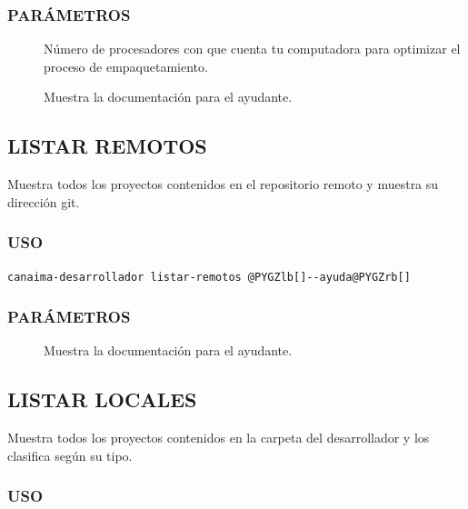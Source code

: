 \documentclass[letterpaper,12pt,spanish]{manual}
\begin{document}
\subsubsection{PARÁMETROS}
\begin{description}
\item[{}] \leavevmode
Número de procesadores con que cuenta tu computadora para optimizar el proceso de empaquetamiento.

\item[{}] \leavevmode
Muestra la documentación para el ayudante.

\end{description}


\subsection{\textbf{LISTAR REMOTOS}}

Muestra todos los proyectos contenidos en el repositorio remoto y muestra su dirección git.


\subsubsection{USO}

\begin{Verbatim}[commandchars=@\[\]]
canaima-desarrollador listar-remotos @PYGZlb[]--ayuda@PYGZrb[]
\end{Verbatim}


\subsubsection{PARÁMETROS}
\begin{description}
\item[{}] \leavevmode
Muestra la documentación para el ayudante.

\end{description}


\subsection{\textbf{LISTAR LOCALES}}

Muestra todos los proyectos contenidos en la carpeta del desarrollador y los clasifica según su tipo.


\subsubsection{USO}
\end{document}
